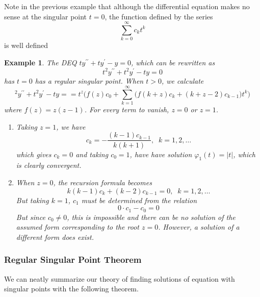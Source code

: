 \documentclass{article}
\newtheorem{example}{Example}[section]
\theoremstyle{remark}
\theoremstyle{definition}
\begin{document}
      Note in the previous example that although the differential equation makes no sense at the singular point $t = 0$, the function defined by the series 
      \[\sum_{k=0}^\infty c_k t^k\]
      is well defined 

      \begin{example}
      The DEQ $t y^{\prime\prime} + ty^\prime - y = 0$, which can be rewritten as
      \[t^2 y^{\prime\prime} + t^2 y^\prime - ty = 0\]
      has $t = 0$ has a regular singular point. When $t>0$, we calculate
      \[^2 y^{\prime\prime} + t^2 y^\prime - ty =  = t^z \bigg( f(z) c_0 + \sum_{k=1}^\infty \big( f(k+z) c_k + (k+z-2) c_{k-1}\big) t^k \bigg)\]
      where $f(z) = z (z-1)$. For every term to vanish, $z = 0$ or $z = 1$. 
      \begin{enumerate}
          \item Taking $z = 1$, we have 
          \[c_k = -\frac{(k-1) c_{k-1}}{k (k+1)}, \;\; k = 1, 2, \ldots\]
          which gives $c_k = 0$ and taking $c_0 = 1$, have have solution $\varphi_1 (t) = |t|$, which is clearly convergent. 
          \item When $z=0$, the recursion formula becomes
          \[k(k-1) c_k + (k-2) c_{k-1} = 0, \;\; k = 1, 2, \ldots\]
          But taking $k=1$, $c_1$ must be determined from the relation 
          \[0 \cdot c_1 - c_0 = 0\]
          But since $c_0 \neq 0$, this is impossible and there can be no solution of the assumed form corresponding to the root $z=0$. However, a solution of a different form does exist. 
      \end{enumerate}
      \end{example}

    \subsubsection{Regular Singular Point Theorem}

      We can neatly summarize our theory of finding solutions of equation with singular points with the following theorem. 
\end{document}

